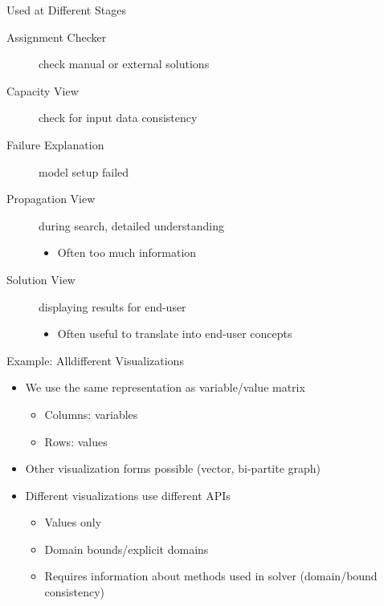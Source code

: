 \documentclass[dvipsnames,aspectratio=169]{beamer}
\begin{document}
\begin{frame}{Used at Different Stages}
\begin{description}
    \item[Assignment Checker] check manual or external solutions
    \item[Capacity View] check for input data consistency
    \item[Failure Explanation] model setup failed
    \item[Propagation View] during search, detailed understanding
    \begin{itemize}
        \item Often too much information
    \end{itemize}
    \item[Solution View] displaying results for end-user
    \begin{itemize}
        \item Often useful to translate into end-user concepts
    \end{itemize}
\end{description}    
\end{frame}

\begin{frame}{Example: Alldifferent Visualizations}
\begin{itemize}
    \item We use the same representation as variable/value matrix
    \begin{itemize}
        \item Columns: variables
        \item Rows: values
    \end{itemize}
    \item Other visualization forms possible (vector, bi-partite graph)
    \item Different visualizations use different APIs
    \begin{itemize}
        \item Values only
        \item Domain bounds/explicit domains
        \item Requires information about methods used in solver (domain/bound consistency)
    \end{itemize}
\end{itemize}
\end{frame}
\end{document}
